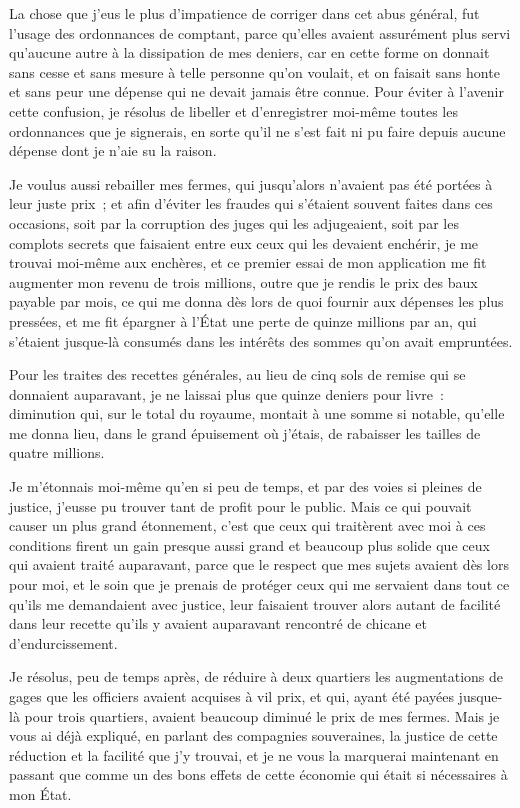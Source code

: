 \documentclass[french,twoside]{book} %
\begin{document}
La chose que j’eus le plus d’impatience de corriger dans cet abus général, fut l’usage des ordonnances de comptant, parce qu’elles avaient assurément plus servi qu’aucune autre à la dissipation de mes deniers, car en cette forme on donnait sans cesse et sans mesure à telle personne qu’on voulait, et on faisait sans honte et sans peur une dépense qui ne devait jamais être connue. Pour éviter à l’avenir cette confusion, je résolus de libeller et d’enregistrer moi-même toutes les ordonnances que je signerais, en sorte qu’il ne s’est fait ni pu faire depuis aucune dépense dont je n’aie su la raison.\par
Je voulus aussi rebailler mes fermes, qui jusqu’alors n’avaient pas été portées à leur juste prix ; et afin d’éviter les fraudes qui s’étaient souvent faites dans ces occasions, soit par la corruption des juges qui les adjugeaient, soit par les complots secrets que faisaient entre eux ceux qui les devaient enchérir, je me trouvai moi-même aux enchères, et ce premier essai de mon application me fit augmenter mon revenu de trois millions, outre que je rendis le prix des baux payable par mois, ce qui me donna dès lors de quoi fournir aux dépenses les plus pressées, et me fit épargner à l’État une perte de quinze millions par an, qui s’étaient jusque-là consumés dans les intérêts des sommes qu’on avait empruntées.\par
Pour les traites des recettes générales, au lieu de cinq sols de remise qui se donnaient auparavant, je ne laissai plus que quinze deniers pour livre : diminution qui, sur le total du royaume, montait à une somme si notable, qu’elle me donna lieu, dans le grand épuisement où j’étais, de rabaisser les tailles de quatre millions.\par
Je m’étonnais moi-même qu’en si peu de temps, et par des voies si pleines de justice, j’eusse pu trouver tant de profit pour le public. Mais ce qui pouvait causer un plus grand étonnement, c’est que ceux qui traitèrent avec moi à ces conditions firent un gain presque aussi grand et beaucoup plus solide que ceux qui avaient traité auparavant, parce que le respect que mes sujets avaient dès lors pour moi, et le soin que je prenais de protéger ceux qui me servaient dans tout ce qu’ils me demandaient avec justice, leur faisaient trouver alors autant de facilité dans leur recette qu’ils y avaient auparavant rencontré de chicane et d’endurcissement.\par
Je résolus, peu de temps après, de réduire à deux quartiers les augmentations de gages que les officiers avaient acquises à vil prix, et qui, ayant été payées jusque-là pour trois quartiers, avaient beaucoup diminué le prix de mes fermes. Mais je vous ai déjà expliqué, en parlant des compagnies souveraines, la justice de cette réduction et la facilité que j’y trouvai, et je ne vous la marquerai maintenant en passant que comme un des bons effets de cette économie qui était si nécessaires à mon État.\par
\end{document}
